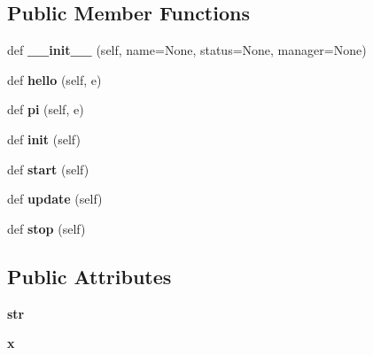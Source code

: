 \subsection*{Public Member Functions}
\begin{DoxyCompactItemize}
\item 
\mbox{\label{classelma_1_1test_1_1test__process_1_1TestProcess_a84bfdbfccb64a0936b5ebefe85adf1a9}} 
def {\bfseries \+\_\+\+\_\+init\+\_\+\+\_\+} (self, name=None, status=None, manager=None)
\item 
\mbox{\label{classelma_1_1test_1_1test__process_1_1TestProcess_af89f2474553f0246a4a71aa5abc6c038}} 
def {\bfseries hello} (self, e)
\item 
\mbox{\label{classelma_1_1test_1_1test__process_1_1TestProcess_afc1162f9234c83f55a942fc50acc921e}} 
def {\bfseries pi} (self, e)
\item 
\mbox{\label{classelma_1_1test_1_1test__process_1_1TestProcess_a26a44df47fb0758cf808c9efe4c39bfc}} 
def {\bfseries init} (self)
\item 
\mbox{\label{classelma_1_1test_1_1test__process_1_1TestProcess_a4475739a2b7898dd5d138cc7c59879d9}} 
def {\bfseries start} (self)
\item 
\mbox{\label{classelma_1_1test_1_1test__process_1_1TestProcess_a55c1cee8682fe48db1649fd1f1aa603f}} 
def {\bfseries update} (self)
\item 
\mbox{\label{classelma_1_1test_1_1test__process_1_1TestProcess_a2c4a784c3c7531220cf114f6bf84b5af}} 
def {\bfseries stop} (self)
\end{DoxyCompactItemize}
\subsection*{Public Attributes}
\begin{DoxyCompactItemize}
\item 
\mbox{\label{classelma_1_1test_1_1test__process_1_1TestProcess_a206dcaf5ce8086f6ddc812c5d5c06ff7}} 
{\bfseries str}
\item 
\mbox{\label{classelma_1_1test_1_1test__process_1_1TestProcess_a2c109ab29963b2037822f52a3ec93784}} 
{\bfseries x}
\end{DoxyCompactItemize}


